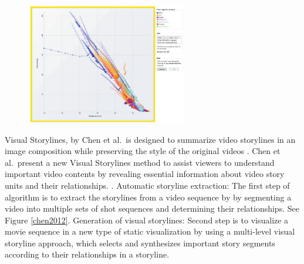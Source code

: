 \documentclass{egpubl}
\begin{document}
\begin{figure}
\begingroup
\centering
\includegraphics[width=7cm]{./images/Robertson}
\label{fig:Robertson}
\endgroup
\end{figure}

Visual Storylines, by Chen et al.\, is designed to summarize video storylines in an image composition while preserving the style of the original videos \cite{chen2012visual}.
Chen et al.\ present a new Visual Storylines method to assist viewers to understand important video contents by
revealing essential information about video story units and their relationships. \cite{chen2012visual}.
Automatic storyline extraction: The first step of algorithm is to extract the storylines from a video sequence by by segmenting a video
into multiple sets of shot sequences and determining their relationships. See Figure \ref{chen2012}.
Generation of visual storylines: Second step is to visualize a movie sequence in a new type of static visualization by using a multi-level visual storyline approach, which selects and synthesizes important story segments according to their relationships in a storyline.
\end{document}
